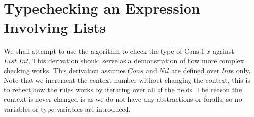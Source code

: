 






\section{Typechecking an Expression Involving Lists}
We shall attempt to use the algorithm to check the type of $\text{Cons}\;1\;x$ against $List\;Int$. This derivation should serve as a demonstration of how more complex checking works. This derivation assumes $Cons$ and $Nil$ are defined over $Int$s only. Note that we increment the context number without changing the context, this is to reflect how the \Unionsubrulename rules works by iterating over all of the fields. The reason the context is never changed is as we do not have any abstractions or foralls, so no variables or type variables are introduced.

